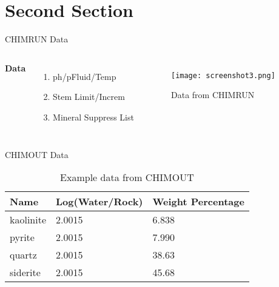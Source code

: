 \documentclass[aspectratio=169,xcolor=dvipsnames]{beamer}
\begin{document}
\section{Second Section}

\begin{frame}{CHIMRUN Data}
    \begin{columns}[c] %

        \textbf{Data}
        \begin{enumerate}
            \item ph/pFluid/Temp
            \item Stem Limit/Increm
            \item Mineral Suppress List
        \end{enumerate}

        \begin{figure}
            \centering
            \texttt{[image: screenshot3.png]}
            \caption{Data from CHIMRUN}
            \label{fig:enter-label}
        \end{figure}
        
    \end{columns}
\end{frame}


\begin{frame}{CHIMOUT Data}
    \begin{table}
        \begin{tabular}{l l l}
            \toprule
            \textbf{Name} & \textbf{Log(Water/Rock)} & \textbf{Weight Percentage} \\
            \midrule
            kaolinite & 2.0015 & 6.838    \\
            pyrite & 2.0015 & 7.990       \\
            quartz & 2.0015 & 38.63       \\
            siderite & 2.0015 & 45.68     \\
            \bottomrule
        \end{tabular}
        \caption{Example data from CHIMOUT}
    \end{table}
\end{frame}
\end{document}

